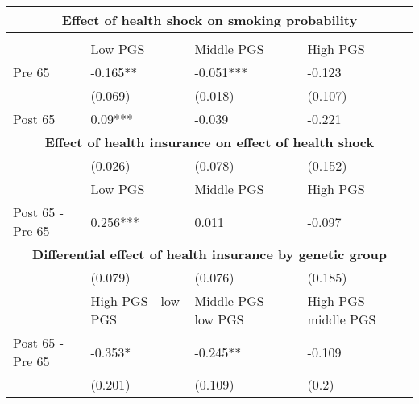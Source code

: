 % 
\begin{tabular}{llll}
  \toprule
  \multicolumn{4}{c}{ \textbf{Effect of health shock on smoking probability}} \\
 \midrule
 &  &  &  \\ 
   \midrule
 & Low PGS & Middle PGS & High PGS \\ 
  Pre 65 & -0.165** & -0.051*** & -0.123 \\ 
   & (0.069) & (0.018) & (0.107) \\ 
  Post 65 & 0.09*** & -0.039 & -0.221 \\ 
   \toprule \multicolumn{4}{c}{ \textbf{Effect of health insurance on effect of health shock}} \\
 \midrule
 & (0.026) & (0.078) & (0.152) \\ 
   \midrule
 & Low PGS & Middle PGS & High PGS \\ 
  Post 65 - Pre 65 & 0.256*** & 0.011 & -0.097 \\ 
   \toprule \multicolumn{4}{c}{ \textbf{Differential effect of health insurance by genetic group}} \\
 \midrule
 & (0.079) & (0.076) & (0.185) \\ 
   \midrule
 & High PGS - low PGS & Middle PGS - low PGS & High PGS - middle PGS \\ 
  Post 65 - Pre 65 & -0.353* & -0.245** & -0.109 \\ 
   & (0.201) & (0.109) & (0.2) \\ 
  \end{tabular}
